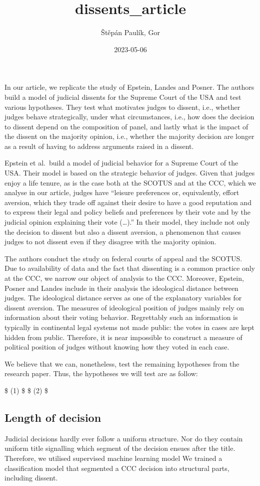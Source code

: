 \documentclass[
]{article}
\title{dissents\_article}
\author{Štěpán Paulík, Gor}
\date{2023-05-06}
\begin{document}
\maketitle

In our article, we replicate the study of Epstein, Landes and Posner.
The authors build a model of judicial dissents for the Supreme Court of
the USA and test various hypotheses. They test what motivates judges to
dissent, i.e., whether judges behave strategically, under what
circumstances, i.e., how does the decision to dissent depend on the
composition of panel, and lastly what is the impact of the dissent on
the majority opinion, i.e., whether the majority decision are longer as
a result of having to address arguments raised in a dissent.

Epstein et al.~build a model of judicial behavior for a Supreme Court of
the USA. Their model is based on the strategic behavior of judges. Given
that judges enjoy a life tenure, as is the case both at the SCOTUS and
at the CCC, which we analyse in our article, judges have ``leisure
preferences or, equivalently, effort aversion, which they trade off
against their desire to have a good reputation and to express their
legal and policy beliefs and preferences by their vote and by the
judicial opinion explaining their vote (\ldots).'' In their model, they
include not only the decision to dissent but also a dissent aversion, a
phenomenon that causes judges to not dissent even if they disagree with
the majority opinion.

The authors conduct the study on federal courts of appeal and the
SCOTUS. Due to availability of data and the fact that dissenting is a
common practice only at the CCC, we narrow our object of analysis to the
CCC. Moreover, Epstein, Posner and Landes include in their analysis the
ideological distance between judges. The ideological distance serves as
one of the explanatory variables for dissent aversion. The measures of
ideological position of judges mainly rely on information about their
voting behavior. Regrettably such an information is typically in
continental legal systems not made public: the votes in cases are kept
hidden from public. Therefore, it is near impossible to construct a
measure of political position of judges without knowing how they voted
in each case.

We believe that we can, nonetheless, test the remaining hypotheses from
the research paper. Thus, the hypotheses we will test are as follow:

\$ (1) \$ \$ (2) \$

\hypertarget{length-of-decision}{%
\subsection{Length of decision}\label{length-of-decision}}

Judicial decisions hardly ever follow a uniform structure. Nor do they
contain uniform title signalling which segment of the decision ensues
after the title. Therefore, we utilised supervised machine learning
model We trained a classification model that segmented a CCC decision
into structural parts, including dissent.
\end{document}
